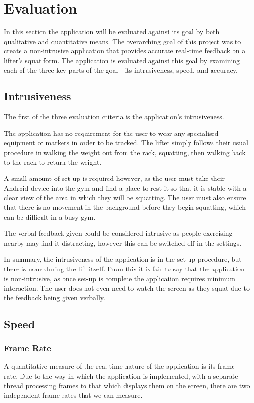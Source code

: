 \chapter{Evaluation}

In this section the application will be evaluated against its goal by both qualitative and quantitative means. The overarching goal of this project was to create a non-intrusive application that provides accurate real-time feedback on a lifter's squat form. The application is evaluated against this goal by examining each of the three key parts of the goal - its intrusiveness, speed, and accuracy.

\section{Intrusiveness}
The first of the three evaluation criteria is the application's intrusiveness. 

The application has no requirement for the user to wear any specialised equipment or markers in order to be tracked. The lifter simply follows their usual procedure in walking the weight out from the rack, squatting, then walking back to the rack to return the weight.

A small amount of set-up is required however, as the user must take their Android device into the gym and find a place to rest it so that it is stable with a clear view of the area in which they will be squatting. The user must also ensure that there is no movement in the background before they begin squatting, which can be difficult in a busy gym.

The verbal feedback given could be considered intrusive as people exercising nearby may find it distracting, however this can be switched off in the settings.

In summary, the intrusiveness of the application is in the set-up procedure, but there is none during the lift itself. From this it is fair to say that the application is non-intrusive, as once set-up is complete the application requires minimum interaction. The user does not even need to watch the screen as they squat due to the feedback being given verbally.

\section{Speed}

\subsection{Frame Rate}
A quantitative measure of the real-time nature of the application is its frame rate. Due to the way in which the application is implemented, with a separate thread processing frames to that which displays them on the screen, there are two independent frame rates that we can measure.

